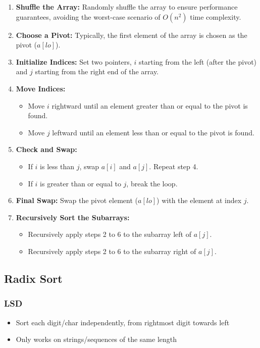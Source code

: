 \documentclass{article}
\begin{document}
\begin{enumerate}
  \item \textbf{Shuffle the Array:} Randomly shuffle the array to ensure performance guarantees, avoiding the worst-case scenario of $O(n^2)$ time complexity.
  \item \textbf{Choose a Pivot:} Typically, the first element of the array is chosen as the pivot ($a[lo]$).
  \item \textbf{Initialize Indices:} Set two pointers, $i$ starting from the left (after the pivot) and $j$ starting from the right end of the array.
  \item \textbf{Move Indices:}
    \begin{itemize}
      \item Move $i$ rightward until an element greater than or equal to the pivot is found.
      \item Move $j$ leftward until an element less than or equal to the pivot is found.
    \end{itemize}
  \item \textbf{Check and Swap:}
    \begin{itemize}
      \item If $i$ is less than $j$, swap $a[i]$ and $a[j]$. Repeat step 4.
      \item If $i$ is greater than or equal to $j$, break the loop.
    \end{itemize}
   \item \textbf{Final Swap:} Swap the pivot element ($a[lo]$) with the element at index $j$.
    \item \textbf{Recursively Sort the Subarrays:} 
    \begin{itemize}
      \item Recursively apply steps 2 to 6 to the subarray left of $a[j]$.
      \item Recursively apply steps 2 to 6 to the subarray right of $a[j]$.
    \end{itemize}
\end{enumerate}


\subsection{Radix Sort}

\subsubsection{LSD}

\begin{itemize}
    \item Sort each digit/char independently, from rightmost digit towards left
    \item Only works on strings/sequences of the same length
\end{itemize}
\end{document}
